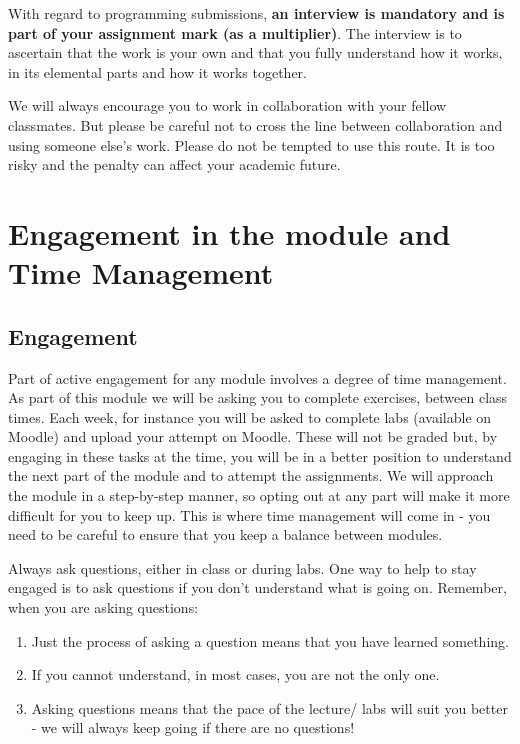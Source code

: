 \documentclass{article}
\begin{document}
 With regard to programming submissions, \textbf{an interview is mandatory and is part of your assignment mark (as a multiplier)}. 
 The interview is to ascertain that the work is your own and that you fully understand how it works, in its elemental parts and how it works together. 
 
We  will always encourage you to work in collaboration with your fellow classmates. But please be careful not to cross the line between collaboration and using someone else's work. 
 Please do not be tempted to use this route. 
 It is too risky and the penalty can affect your academic future. 
\pagebreak
\section{Engagement in the module and Time Management}
\subsection{Engagement}
 Part of active engagement  for any module involves a degree of time management. 
 As part of this module we will be asking you to complete exercises, between class times. 
 Each week, for instance you will be asked to complete labs (available on Moodle) and upload your attempt on Moodle.
 These will not be graded but, by engaging in these tasks at the time, you will be in a better position to 
 understand the next part of the module and to attempt the assignments. We will approach the module in a step-by-step manner, 
 so opting out at any part will make it more difficult for you to keep up. 
 This is where time management will come in - you need to be careful to ensure that you keep a balance between modules. 
 
 Always ask questions, either in class or during labs.  One way to help to stay engaged is to ask questions if you don't understand what is going on. 
 Remember, when you are asking questions:
 \begin{enumerate}
    \item Just the process of asking a question means that you have learned something. 
    \item If you cannot understand, in most cases, you are not the only one. 
    \item Asking questions means that the pace of the lecture/ labs will suit you better - we will always keep going if there are no questions! 
 \end{enumerate}
\end{document}

